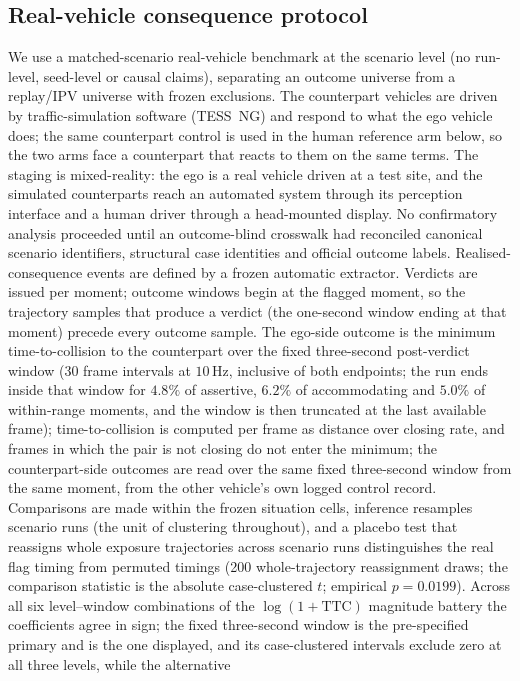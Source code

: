 \documentclass[12pt,a4paper]{article}
\begin{document}
\subsection{Real-vehicle consequence protocol}
We use a matched-scenario real-vehicle benchmark at the scenario level (no run-level, seed-level or
causal claims), separating an outcome universe from a replay/IPV universe with frozen exclusions.
The counterpart vehicles are driven by traffic-simulation software (TESS~NG) and respond to what the
ego vehicle does; the same counterpart control is used in the human reference arm below, so the two
arms face a counterpart that reacts to them on the same terms. The staging is mixed-reality: the ego
is a real vehicle driven at a test site, and the simulated counterparts reach an automated system
through its perception interface and a human driver through a head-mounted display. No
confirmatory analysis proceeded until an outcome-blind crosswalk had reconciled canonical scenario
identifiers, structural case identities and official outcome labels. Realised-consequence events are
defined by a frozen automatic extractor. Verdicts are issued per moment; outcome windows begin at
the flagged moment, so the trajectory samples that produce a verdict (the one-second window ending
at that moment) precede every outcome sample. The ego-side outcome is the minimum time-to-collision
to the counterpart over the fixed three-second post-verdict window ($30$ frame intervals at
$10$\,Hz, inclusive of both endpoints; the run ends inside that window for $4.8\%$ of assertive,
$6.2\%$ of accommodating and $5.0\%$ of within-range moments, and the window is then truncated at
the last available frame); time-to-collision is computed per frame as distance over closing rate,
and frames in which the pair is not closing do not enter the minimum; the counterpart-side outcomes
are read over the same fixed three-second window from the same moment, from the other vehicle's own
logged control record.
Comparisons are made within the frozen situation cells, inference resamples scenario runs (the unit
of clustering throughout), and a placebo test that reassigns whole exposure trajectories across
scenario runs distinguishes the real flag timing from permuted timings (200 whole-trajectory reassignment draws; the comparison statistic is the absolute case-clustered $t$; empirical $p=0.0199$).
Across all six level--window combinations of the $\log(1+\mathrm{TTC})$ magnitude battery the
coefficients agree in sign; the fixed three-second window is the pre-specified primary and is the one
displayed, and its case-clustered intervals exclude zero at all three levels, while the alternative
\end{document}
